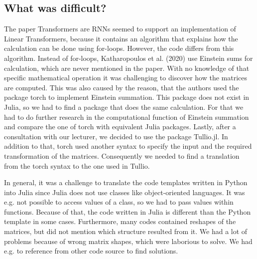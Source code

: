 \documentclass[DIV=13,fontsize=11pt]{scrartcl}
\begin{document}



\subsection{What was difficult?}
The paper Transformers are RNNs seemed to support an implementation of Linear Transformers, because it contains an algorithm that explains how the calculation can be done using for-loops. However, the code differs from this algorithm. Instead of for-loops, Katharopoulos et al. (2020) use Einstein sums for calculation, which are never mentioned in the paper. With no knowledge of that specific mathematical operation it was challenging to discover how the matrices are computed. This was also caused by the reason, that the authors used the package torch to implement Einstein summation. This package does not exist in Julia, so we had to find a package that does the same calculation. For that we had to do further research in the computational function of Einstein summation and compare the one of torch with equivalent Julia packages. Lastly, after a consultation with our lecturer, we decided to use the package Tullio.jl. In addition to that, torch used another syntax to specify the input and the required transformation of the matrices. Consequently we needed to find a translation from the torch syntax to the one used in Tullio.

In general, it was a challenge to translate the code templates written in Python into Julia since Julia does not use classes like object-oriented languages. It was e.g. not possible to access values of a class, so we had to pass values within functions. Because of that, the code written in Julia is different than the Python template in some cases. Furthermore, many codes contained reshapes of the matrices, but did not mention which structure resulted from it. We had a lot of problems because of wrong matrix shapes, which were laborious to solve.  We had e.g. to reference from other code source to find solutions.
\end{document}
